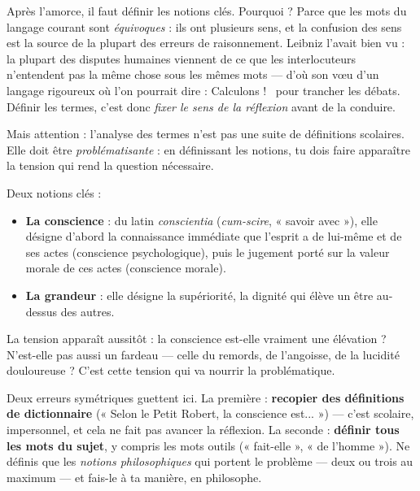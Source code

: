 \documentclass[11pt]{article}
\begin{document}
Après l'amorce, il faut définir les notions clés. Pourquoi ? Parce que les mots du langage courant sont \emph{équivoques} : ils ont plusieurs sens, et la confusion des sens est la source de la plupart des erreurs de raisonnement. Leibniz l'avait bien vu : la plupart des disputes humaines viennent de ce que les interlocuteurs n'entendent pas la même chose sous les mêmes mots — d'où son vœu d'un langage rigoureux où l'on pourrait dire : \guillemotleft Calculons ! \guillemotright\ pour trancher les débats. Définir les termes, c'est donc \emph{fixer le sens de la réflexion} avant de la conduire.

Mais attention : l'analyse des termes n'est pas une suite de définitions scolaires. Elle doit être \emph{problématisante} : en définissant les notions, tu dois faire apparaître la tension qui rend la question nécessaire.

\begin{exemplebox}
Deux notions clés :
\begin{itemize}
\item \textbf{La conscience} : du latin \emph{conscientia} (\emph{cum-scire}, « savoir avec »), elle désigne d'abord la connaissance immédiate que l'esprit a de lui-même et de ses actes (conscience psychologique), puis le jugement porté sur la valeur morale de ces actes (conscience morale).
\item \textbf{La grandeur} : elle désigne la supériorité, la dignité qui élève un être au-dessus des autres.
\end{itemize}
La tension apparaît aussitôt : la conscience est-elle vraiment une élévation ? N'est-elle pas aussi un fardeau — celle du remords, de l'angoisse, de la lucidité douloureuse ? C'est cette tension qui va nourrir la problématique.
\end{exemplebox}

\begin{attention}
Deux erreurs symétriques guettent ici. La première : \textbf{recopier des définitions de dictionnaire} (« Selon le Petit Robert, la conscience est... ») — c'est scolaire, impersonnel, et cela ne fait pas avancer la réflexion. La seconde : \textbf{définir tous les mots du sujet}, y compris les mots outils (« fait-elle », « de l'homme »). Ne définis que les \emph{notions philosophiques} qui portent le problème — deux ou trois au maximum — et fais-le à ta manière, en philosophe.
\end{attention}
\end{document}
